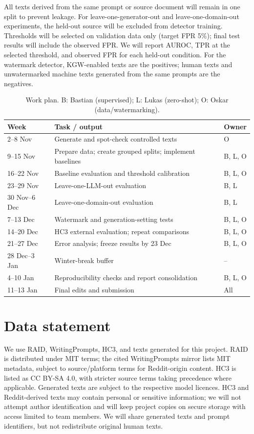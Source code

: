 \documentclass[11pt]{article}
\begin{document}
All texts derived from the same prompt or source document will remain in one split to prevent leakage. For leave-one-generator-out and leave-one-domain-out experiments, the held-out source will be excluded from detector training. Thresholds will be selected on validation data only (target FPR 5\%); final test results will include the observed FPR. We will report AUROC, TPR at the selected threshold, and observed FPR for each held-out condition. For the watermark detector, KGW-enabled texts are the positives; human texts and unwatermarked machine texts generated from the same prompts are the negatives.

\begin{table}[t]
\centering\scriptsize
\begin{tabularx}{\columnwidth}{@{}p{} X p{}@{}}
\toprule
\textbf{Week} & \textbf{Task / output} & \textbf{Owner}\\
\midrule
2--8 Nov & Generate and spot-check controlled texts & O\\
9--15 Nov & Prepare data; create grouped splits; implement baselines & B, L, O\\
16--22 Nov & Baseline evaluation and threshold calibration & B, L, O\\
23--29 Nov & Leave-one-LLM-out evaluation & B, L\\
30 Nov--6 Dec & Leave-one-domain-out evaluation & B, L\\
7--13 Dec & Watermark and generation-setting tests & B, L, O\\
14--20 Dec & HC3 external evaluation; repeat comparisons & B, L, O\\
21--27 Dec & Error analysis; freeze results by 23 Dec & B, L, O\\
28 Dec--3 Jan & Winter-break buffer & --\\
4--10 Jan & Reproducibility checks and report consolidation & B, L, O\\
11--13 Jan & Final edits and submission & All\\
\bottomrule
\end{tabularx}
\caption{Work plan. B: Bastian (supervised); L: Lukas (zero-shot); O: Oskar (data/watermarking).}
\label{tab:plan}
\end{table}

\section{Data statement}
We use RAID, WritingPrompts, HC3, and texts generated for this project. RAID is distributed under MIT terms; the cited WritingPrompts mirror lists MIT metadata, subject to source/platform terms for Reddit-origin content. HC3 is listed as CC BY-SA 4.0, with stricter source terms taking precedence where applicable. Generated texts are subject to the respective model licences. HC3 and Reddit-derived texts may contain personal or sensitive information; we will not attempt author identification and will keep project copies on secure storage with access limited to team members. We will share generated texts and prompt identifiers, but not redistribute original human texts.
\end{document}
